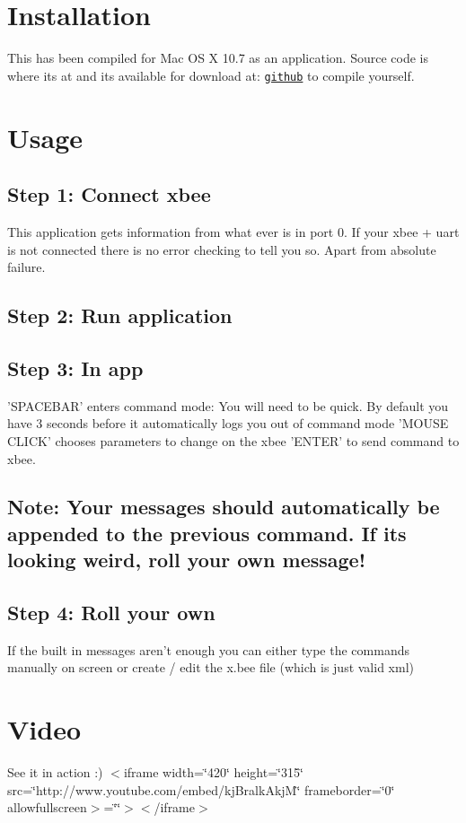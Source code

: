 \hypertarget{index_Installation}{}\section{Installation}\label{index_Installation}
This has been compiled for Mac OS X 10.7 as an application. Source code is where its at and its available for download at: \href{https://github.com/tareiking/xbeeChoice}{\tt github} to compile yourself.\hypertarget{index_install_sec}{}\section{Usage}\label{index_install_sec}
\hypertarget{index_step1}{}\subsection{Step 1: Connect xbee}\label{index_step1}
This application gets information from what ever is in port 0. If your xbee + uart is not connected there is no error checking to tell you so. Apart from absolute failure.\hypertarget{index_step2}{}\subsection{Step 2: Run application}\label{index_step2}
\hypertarget{index_step3}{}\subsection{Step 3: In app}\label{index_step3}
'SPACEBAR' enters command mode: You will need to be quick. By default you have 3 seconds before it automatically logs you out of command mode 'MOUSE CLICK' chooses parameters to change on the xbee 'ENTER' to send command to xbee.\hypertarget{index_step4}{}\subsection{Note: Your messages should automatically be appended to the previous command. If its looking weird, roll your own message!}\label{index_step4}
\hypertarget{index_step5}{}\subsection{Step 4: Roll your own}\label{index_step5}
If the built in messages aren't enough you can either type the commands manually on screen or create / edit the x.bee file (which is just valid xml)\hypertarget{index_Video}{}\section{Video}\label{index_Video}
See it in action :) $<$iframe width=\char`\"{}420\char`\"{} height=\char`\"{}315\char`\"{} src=\char`\"{}http://www.youtube.com/embed/kjBralkAkjM\char`\"{} frameborder=\char`\"{}0\char`\"{} allowfullscreen$>$=\char`\"{}\char`\"{}$>$$<$/iframe$>$ 